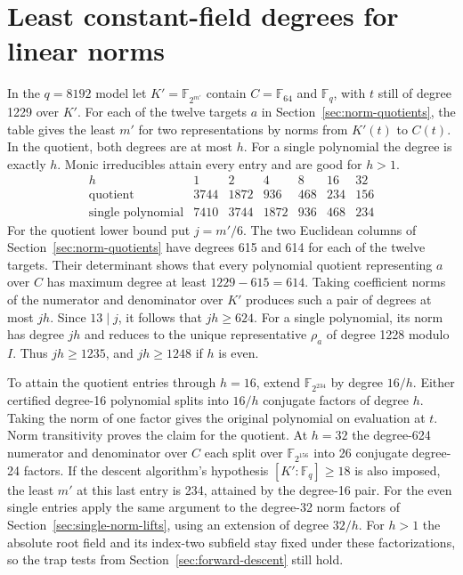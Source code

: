 \documentclass[11pt]{article}
\begin{document}
\section{Least constant-field degrees for linear norms}\label{sec:linear-norm-constants}
In the \(q=8192\) model let \(K'=\mathbb F_{2^{m'}}\) contain
\(C=\mathbb F_{64}\) and \(\mathbb F_q\), with \(t\) still of degree
1229 over \(K'\). For each of the twelve targets \(a\) in
Section~\ref{sec:norm-quotients}, the table gives the least \(m'\)
for two representations by norms from \(K'(t)\) to \(C(t)\).
In the quotient, both degrees are at most \(h\). For a single
polynomial the degree is exactly \(h\). Monic irreducibles attain
every entry and are good for \(h>1\).
\[
\begin{array}{l|rrrrrr}
 h&1&2&4&8&16&32\\ \hline
 \text{quotient}&3744&1872&936&468&234&156\\
 \text{single polynomial}&7410&3744&1872&936&468&234
\end{array}
\]
For the quotient lower bound put \(j=m'/6\). The two Euclidean columns
of Section~\ref{sec:norm-quotients} have degrees 615 and 614 for
each of the twelve targets. Their determinant shows that every
polynomial quotient representing \(a\) over \(C\) has maximum degree
at least \(1229-615=614\). Taking coefficient norms of the numerator
and denominator over \(K'\) produces such a pair of degrees at most
\(jh\). Since \(13\mid j\), it follows that \(jh\ge624\).
For a single polynomial, its norm has degree \(jh\) and reduces to
the unique representative \(\rho_a\) of degree 1228 modulo \(I\).
Thus \(jh\ge1235\), and \(jh\ge1248\) if \(h\) is even.

To attain the quotient entries through \(h=16\), extend \(\mathbb F_{2^{234}}\) by
degree \(16/h\). Either certified degree-16 polynomial splits into
\(16/h\) conjugate factors of degree \(h\). Taking the norm of one
factor gives the original polynomial on evaluation at \(t\). Norm
transitivity proves the claim for the quotient. At \(h=32\) the
degree-624 numerator and denominator over \(C\) each split over
\(\mathbb F_{2^{156}}\) into 26 conjugate degree-24 factors. If the
descent algorithm's hypothesis \([K':\mathbb F_q]\ge18\) is also imposed,
the least \(m'\) at this last entry is 234, attained by the degree-16
pair. For the even single
entries apply the same argument to the degree-32 norm factors of
Section~\ref{sec:single-norm-lifts}, using an extension of degree
\(32/h\). For \(h>1\) the absolute root field and its index-two
subfield stay fixed under these factorizations, so the trap tests
from Section~\ref{sec:forward-descent} still hold.
\end{document}
